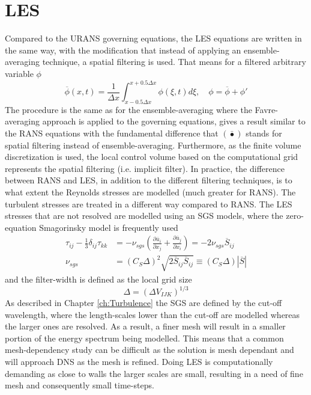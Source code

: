 \section{LES}
Compared to the URANS governing equations, the LES equations are written in the same way, with the modification that instead of applying an ensemble-averaging technique, a spatial filtering is used. That means for a filtered arbitrary variable $\phi$
\begin{equation}
  \overline{\phi}(x,t) = \frac{1}{\Delta x}\int ^{x+0.5\Delta x} _{x-0.5\Delta x} \phi(\xi,t) d\xi, \quad \phi = \overline{\phi}+\phi'
\end{equation}
The procedure is the same as for the ensemble-averaging where the Favre-averaging approach is applied to the governing equations, gives a result similar to the RANS equations with the fundamental difference that $\left(\bar{\bullet}\right)$ stands for spatial filtering instead of ensemble-averaging. Furthermore, as the finite volume discretization is used, the local control volume based on the computational grid represents the spatial filtering (i.e. implicit filter). In practice, the difference between RANS and LES, in addition to the different filtering techniques, is to what extent the Reynolds stresses are modelled (much greater for RANS). The turbulent stresses are treated in a different way compared to RANS. The LES stresses that are not resolved are modelled using an SGS models, where the zero-equation Smagorinsky model \cite{Smagorinsky} is frequently used
\begin{equation}
  \begin{aligned}  \tau_{ij} - \frac{1}{3}\delta_{ij}\tau_{kk} &= -\nu_{sgs}\left(\frac{\partial \overline{u}_i}{\partial x_j}+\frac{\partial \overline{u}_j}{\partial x_i}\right) = -2\nu_{sgs}\overline{S}_{ij}\\
  \nu_{sgs} &=\left(C_S\Delta \right)^2\sqrt{2\overline{S}_{ij}\overline{S}_{ij}} \equiv \left(C_S\Delta \right)\left|\overline{S}\right|
  \end{aligned}
\end{equation}
and the filter-width is defined as the local grid size 
\begin{equation}
  \Delta = \left(\Delta V_{IJK}\right)^{1/3}
\end{equation}
As described in Chapter \ref{ch:Turbulence} the SGS are defined by the cut-off wavelength, where the length-scales lower than the cut-off are modelled whereas the larger ones are resolved. As a result, a finer mesh will result in a smaller portion of the energy spectrum being modelled. This means that a common mesh-dependency study can be difficult as the solution is mesh dependant and will approach DNS as the mesh is refined. Doing LES is computationally demanding as close to walls the larger scales are small, resulting in a need of fine mesh and consequently small time-steps. 

